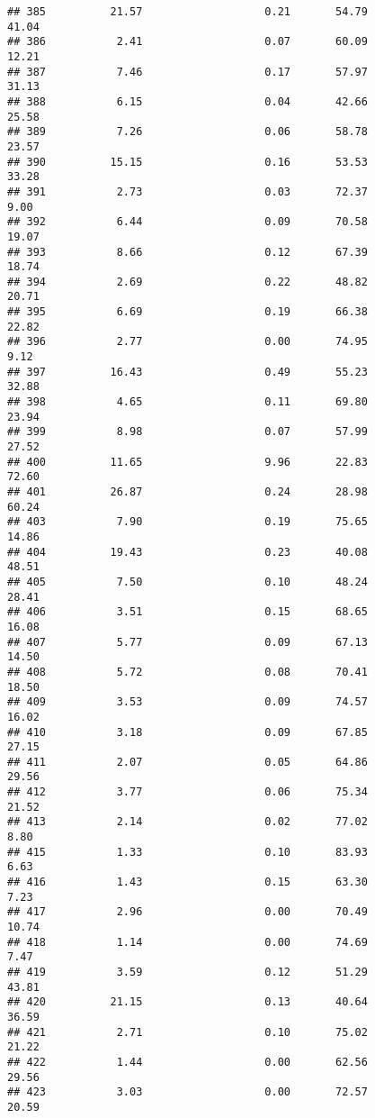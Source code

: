 \documentclass[
]{article}
\begin{document}
\begin{verbatim}
## 385          21.57                   0.21       54.79          41.04
## 386           2.41                   0.07       60.09          12.21
## 387           7.46                   0.17       57.97          31.13
## 388           6.15                   0.04       42.66          25.58
## 389           7.26                   0.06       58.78          23.57
## 390          15.15                   0.16       53.53          33.28
## 391           2.73                   0.03       72.37           9.00
## 392           6.44                   0.09       70.58          19.07
## 393           8.66                   0.12       67.39          18.74
## 394           2.69                   0.22       48.82          20.71
## 395           6.69                   0.19       66.38          22.82
## 396           2.77                   0.00       74.95           9.12
## 397          16.43                   0.49       55.23          32.88
## 398           4.65                   0.11       69.80          23.94
## 399           8.98                   0.07       57.99          27.52
## 400          11.65                   9.96       22.83          72.60
## 401          26.87                   0.24       28.98          60.24
## 403           7.90                   0.19       75.65          14.86
## 404          19.43                   0.23       40.08          48.51
## 405           7.50                   0.10       48.24          28.41
## 406           3.51                   0.15       68.65          16.08
## 407           5.77                   0.09       67.13          14.50
## 408           5.72                   0.08       70.41          18.50
## 409           3.53                   0.09       74.57          16.02
## 410           3.18                   0.09       67.85          27.15
## 411           2.07                   0.05       64.86          29.56
## 412           3.77                   0.06       75.34          21.52
## 413           2.14                   0.02       77.02           8.80
## 415           1.33                   0.10       83.93           6.63
## 416           1.43                   0.15       63.30           7.23
## 417           2.96                   0.00       70.49          10.74
## 418           1.14                   0.00       74.69           7.47
## 419           3.59                   0.12       51.29          43.81
## 420          21.15                   0.13       40.64          36.59
## 421           2.71                   0.10       75.02          21.22
## 422           1.44                   0.00       62.56          29.56
## 423           3.03                   0.00       72.57          20.59

\end{verbatim}
\end{document}
